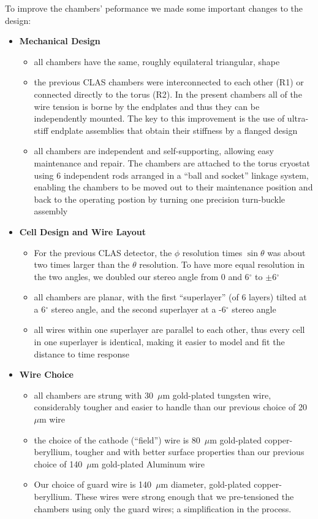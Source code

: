 To improve the chambers' peformance we made some important changes to the design:
\begin{itemize}
\item {\bf Mechanical Design}
\begin{itemize}
\item all chambers have the same, roughly equilateral triangular, shape
\item the previous CLAS chambers were interconnected to each other (R1) or 
connected directly to the torus (R2).  In the present chambers all of the wire tension
is borne by the endplates and thus they can be independently mounted.
The key to this improvement is the use of  
ultra-stiff endplate assemblies that obtain their stiffness 
by a flanged design
\item all chambers are independent and self-supporting, allowing easy
maintenance and repair.  The chambers are attached to the torus cryostat using 6 independent
rods arranged in a ``ball and socket'' linkage system, enabling the chambers to
be moved out to their maintenance position and back to the operating 
postion by turning one precision turn-buckle assembly
\end{itemize}
\item {\bf Cell Design and Wire Layout}
\begin{itemize}  
\item For the previous CLAS detector, the $\phi$ resolution times $\sin \theta$ was about two 
times larger than the $\theta$ resolution.  To have more equal resolution in 
the two angles, we doubled our stereo angle from 0 and 6$^\circ$ to 
$\pm$6$^\circ$
\item all chambers are planar, with the first ``superlayer'' (of 6 layers)
tilted at a 6$^\circ$ stereo angle, and the second superlayer at a -6$^\circ$ stereo angle
\item all wires within one superlayer are parallel to each other, thus
every cell in one superlayer is identical, making it easier to model
and fit the distance to time response
\end{itemize}
\item {\bf Wire Choice}
\begin{itemize}
\item all chambers are strung with 30~$\mu$m gold-plated tungsten wire,
considerably tougher and easier to handle than our previous choice 
of 20~$\mu$m wire 
\item the choice of the cathode (``field'') wire is 80~$\mu$m
gold-plated copper-beryllium, tougher and with better surface properties than our previous
choice of 140~$\mu$m gold-plated Aluminum wire
\item  Our choice of guard wire is 140~$\mu$m diameter, gold-plated
copper-beryllium.  These wires were strong enough that we pre-tensioned 
the chambers using only the guard wires; a simplification in the process.
\end{itemize}
\end{itemize}

